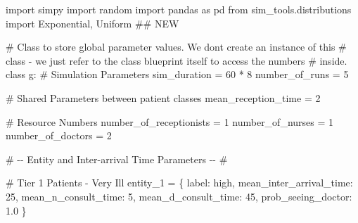 \documentclass[
  letterpaper,
  DIV=11,
  numbers=noendperiod]{scrreprt}
\newenvironment{Shaded}{}{}
\newcommand{\CommentTok}[1]{\textcolor[rgb]{0.42,0.45,0.49}{#1}}
\newcommand{\DecValTok}[1]{\textcolor[rgb]{0.00,0.36,0.77}{#1}}
\newcommand{\FloatTok}[1]{\textcolor[rgb]{0.00,0.36,0.77}{#1}}
\newcommand{\ImportTok}[1]{\textcolor[rgb]{0.01,0.18,0.38}{#1}}
\newcommand{\KeywordTok}[1]{\textcolor[rgb]{0.84,0.23,0.29}{#1}}
\newcommand{\NormalTok}[1]{\textcolor[rgb]{0.14,0.16,0.18}{#1}}
\newcommand{\OperatorTok}[1]{\textcolor[rgb]{0.14,0.16,0.18}{#1}}
\newcommand{\StringTok}[1]{\textcolor[rgb]{0.01,0.18,0.38}{#1}}
\begin{document}
\begin{tcolorbox}[enhanced jigsaw, colframe=quarto-callout-note-color-frame, bottomtitle=1mm, breakable, rightrule=.15mm, coltitle=black, colbacktitle=quarto-callout-note-color!10!white, opacityback=0, leftrule=.75mm, arc=.35mm, toptitle=1mm, title=\textcolor{quarto-callout-note-color}{\faInfo}\hspace{0.5em}{Click here to view the full code}, titlerule=0mm, colback=white, toprule=.15mm, bottomrule=.15mm, left=2mm, opacitybacktitle=0.6]

\label{annotated-cell-277}%
\begin{Shaded}
\begin{Highlighting}[]
\ImportTok{import}\NormalTok{ simpy}
\ImportTok{import}\NormalTok{ random}
\ImportTok{import}\NormalTok{ pandas }\ImportTok{as}\NormalTok{ pd}
\ImportTok{from}\NormalTok{ sim\_tools.distributions }\ImportTok{import}\NormalTok{ Exponential, Uniform }\CommentTok{\#\# NEW}

\CommentTok{\# Class to store global parameter values.  We don\textquotesingle{}t create an instance of this}
\CommentTok{\# class {-} we just refer to the class blueprint itself to access the numbers}
\CommentTok{\# inside.}
\KeywordTok{class}\NormalTok{ g:}
    \CommentTok{\# Simulation Parameters}
\NormalTok{    sim\_duration }\OperatorTok{=} \DecValTok{60} \OperatorTok{*} \DecValTok{8}
\NormalTok{    number\_of\_runs }\OperatorTok{=} \DecValTok{5}

    \CommentTok{\# Shared Parameters between patient classes}
\NormalTok{    mean\_reception\_time }\OperatorTok{=} \DecValTok{2}

    \CommentTok{\# Resource Numbers}
\NormalTok{    number\_of\_receptionists }\OperatorTok{=} \DecValTok{1}
\NormalTok{    number\_of\_nurses }\OperatorTok{=} \DecValTok{1}
\NormalTok{    number\_of\_doctors }\OperatorTok{=} \DecValTok{2}

    \CommentTok{\# {-}{-} Entity and Inter{-}arrival Time Parameters {-}{-} \#}

    \CommentTok{\# Tier 1 Patients {-} Very Ill}
\NormalTok{    entity\_1 }\OperatorTok{=}\NormalTok{ \{}
        \StringTok{\textquotesingle{}label\textquotesingle{}}\NormalTok{: }\StringTok{\textquotesingle{}high\textquotesingle{}}\NormalTok{,}
        \StringTok{\textquotesingle{}mean\_inter\_arrival\_time\textquotesingle{}}\NormalTok{: }\DecValTok{25}\NormalTok{,}
        \StringTok{\textquotesingle{}mean\_n\_consult\_time\textquotesingle{}}\NormalTok{: }\DecValTok{5}\NormalTok{,}
        \StringTok{\textquotesingle{}mean\_d\_consult\_time\textquotesingle{}}\NormalTok{: }\DecValTok{45}\NormalTok{,}
        \StringTok{\textquotesingle{}prob\_seeing\_doctor\textquotesingle{}}\NormalTok{: }\FloatTok{1.0}
\NormalTok{    \}}


\end{Highlighting}
\end{Shaded}
\end{tcolorbox}
\end{document}
